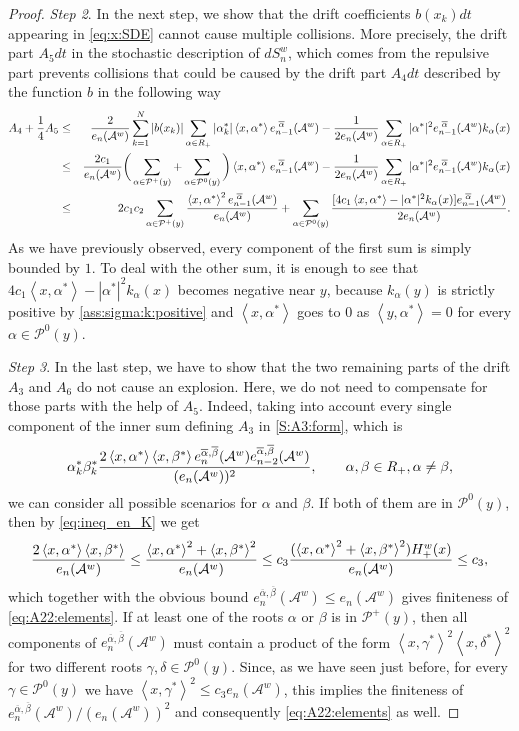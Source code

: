 \documentclass{article}
\numberwithin{equation}{section}
\newcommand{\Aa}{\mathcal{A}^{w}}
\newcommand{\xas}{\left<x,\alpha^*\right>}
\newcommand{\xbs}{\left<x,\beta^*\right>}
\newcommand{\xcs}{\left<x,\gamma^*\right>}
\newcommand{\xds}{\left<x,\delta^*\right>}
\newcommand{\aR}{\alpha\in R_+}
\newcommand{\SaR}{\sum_{\alpha\in R_+}}
\newcommand{\shift}{\,\,}
\newcommand{\eA}[1]{e_{#1}(\Aa)}
\newcommand{\eaA}[1]{e_{#1}^{\shift\overline{\alpha}}(\Aa)}
\newcommand{\eabA}[1]{e_{#1}^{\overline{\alpha}, \overline{\beta}}(\Aa)}
\newcommand{\Pzero}{\mathcal{P}^0(y)}
\newcommand{\Pplus}{\mathcal{P}^+(y)}
\theoremstyle{plain}
\begin{document}
\begin{proof}
{\it Step 2}. 
    In the next step, we show that the drift coefficients $b(x_k)dt$ appearing in \eqref{eq:x:SDE} cannot cause multiple collisions. More precisely, the drift part $A_5dt$ in the stochastic description of $dS_n^w$, which comes from the repulsive part prevents collisions that could be caused by the drift part $A_4dt$ described by the function $b$ in the following way 
    \begin{eqnarray*}
    A_4+\frac{1}{4} A_5 &\leq& \frac{2}{\eA{n}}\sum_{k=1}^N |b(x_k)|\SaR |\alpha_k^*|\xas\eaA{n-1}- \frac{1}{2\eA{n}}\sum_{\aR} |\alpha^*|^2\eaA{n-1}k_\alpha(x)\\
	 &\leq& \frac{2c_1}{\eA{n}}\bigg(\sum_{\alpha\in \Pplus}+\sum_{\alpha\in \Pzero}\bigg) \xas\,\eaA{n-1}- \frac{1}{2\eA{n}}\sum_{\aR} |\alpha^*|^2\eaA{n-1}k_\alpha(x)\\
	    &\leq&2c_1c_2\sum_{\alpha\in \Pplus} \frac{\xas^2\eaA{n-1}}{\eA{n}} + \sum_{\alpha\in \Pzero}\frac{[4c_1\xas-  |\alpha^*|^2k_\alpha(x)]\eaA{n-1}}{2\eA{n}}\/.
\end{eqnarray*} 
As we have previously observed, every component of the first sum is simply bounded by $1$. To deal with the other sum, it is enough to see that $4c_1\xas-|\alpha^*|^2 k_\alpha(x)$ becomes negative near $y$, because $k_\alpha(y)$ is strictly positive by \ref{ass:sigma:k:positive} and $\xas$ goes to $0$ as $\left<y,\alpha^*\right>=0$ for every $\alpha\in \Pzero$.

\bigskip

{\it Step 3}. In the last step, we have to show that the two remaining parts of the drift $A_3$ and $A_6$ do not cause an explosion. Here, we do not need to compensate for those parts with the help of $A_5$. Indeed, taking into account every single component of the inner sum defining $A_3$ in \eqref{S:A3:form}, which is
\begin{equation}
    \label{eq:A22:elements}
    \alpha_k^* \beta_k^* \frac{2\xas\xbs\eabA{n}\eabA{n-2}}{(\eA{n})^2}\/,\qquad \alpha,\beta \in R_+\/,\alpha\neq \beta\/,
\end{equation}
we can consider all possible scenarios for $\alpha$ and $\beta$. If both of them are in $\Pzero$, then by \eqref{eq:ineq_en_K} we get
 \begin{equation*}
     \frac{2\xas\xbs}{\eA{n}} \leq \frac{\xas^2+\xbs^2}{\eA{n}} \leq c_3\frac{(\xas^2+\xbs^2)H_+^w(x)}{\eA{n}}\leq c_3\/, 
 \end{equation*}
 which together with the obvious bound $\eabA{n}\leq \eA{n}$ gives finiteness of \eqref{eq:A22:elements}. If at least one of the roots $\alpha$ or $\beta$ is in $\Pplus$, then all components of $\eabA{n}$ must contain a product of the form $\xcs^2\xds^2$ for two different roots $\gamma,\delta\in \Pzero$. Since, as we have seen just before, for every $\gamma\in \Pzero$ we have $\xcs^2 \leq c_3 \eA{n}$, this implies the finiteness of $\eabA{n}/(\eA{n})^2$ and consequently \eqref{eq:A22:elements} as well. 


\end{proof}
\end{document}
